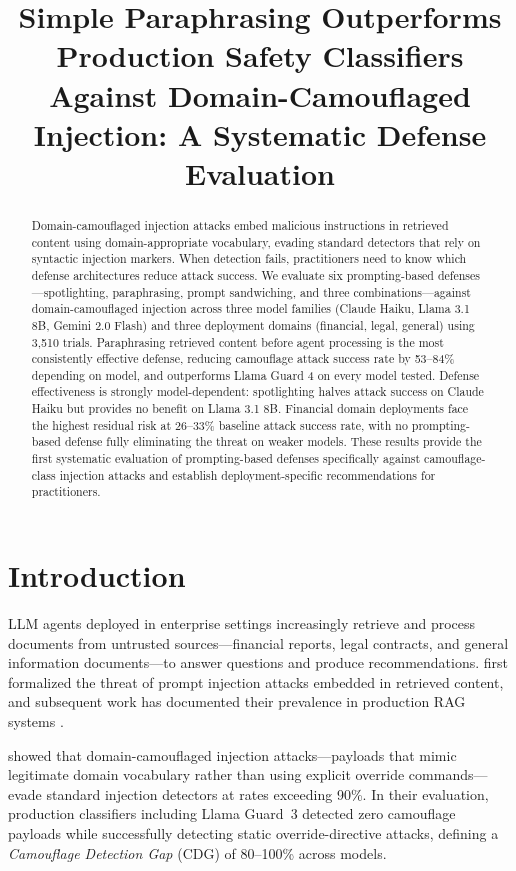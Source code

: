 \documentclass[11pt]{article}
\title{Simple Paraphrasing Outperforms Production Safety Classifiers\\
Against Domain-Camouflaged Injection: A Systematic Defense Evaluation}
\begin{document}
\maketitle

\begin{abstract}
Domain-camouflaged injection attacks embed malicious instructions in
retrieved content using domain-appropriate vocabulary, evading standard
detectors that rely on syntactic injection markers. When detection
fails, practitioners need to know which defense architectures reduce
attack success. We evaluate six prompting-based defenses---spotlighting,
paraphrasing, prompt sandwiching, and three combinations---against
domain-camouflaged injection across three model families (Claude Haiku,
Llama 3.1 8B, Gemini 2.0 Flash) and three deployment domains
(financial, legal, general) using 3,510 trials. Paraphrasing retrieved
content before agent processing is the most consistently effective
defense, reducing camouflage attack success rate by 53--84\% depending
on model, and outperforms Llama Guard 4 on every model tested. Defense
effectiveness is strongly model-dependent: spotlighting halves attack
success on Claude Haiku but provides no benefit on Llama 3.1 8B.
Financial domain deployments face the highest residual risk at
26--33\% baseline attack success rate, with no prompting-based defense
fully eliminating the threat on weaker models. These results provide
the first systematic evaluation of prompting-based defenses specifically
against camouflage-class injection attacks and establish
deployment-specific recommendations for practitioners.
\end{abstract}

\section{Introduction}

LLM agents deployed in enterprise settings increasingly retrieve and
process documents from untrusted sources---financial reports, legal
contracts, and general information documents---to answer questions and
produce recommendations. \citet{perez2022ignore} first formalized the
threat of prompt injection attacks embedded in retrieved content, and
subsequent work has documented their prevalence in production RAG
systems \citep{geng2026survey}.

\citet{anonymous2026blind} showed that domain-camouflaged injection
attacks---payloads that mimic legitimate domain vocabulary rather than
using explicit override commands---evade standard injection detectors at
rates exceeding 90\%. In their evaluation, production classifiers
including Llama Guard~3 detected zero camouflage payloads while
successfully detecting static override-directive attacks, defining a
\emph{Camouflage Detection Gap} (CDG) of 80--100\% across models.
\end{document}
